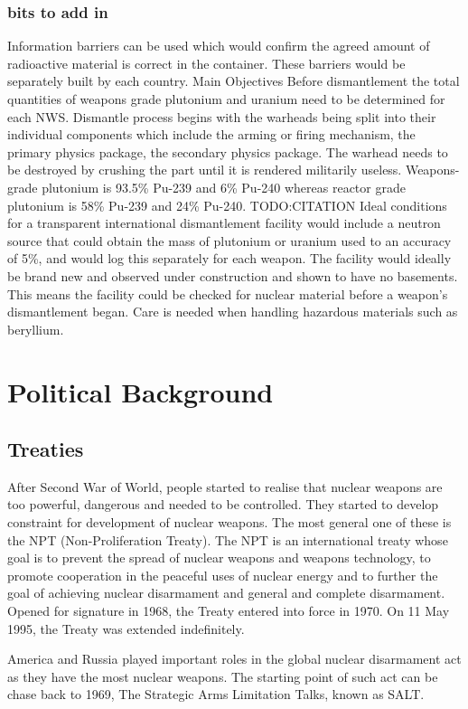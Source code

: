 \documentclass[twoside,titlepage,11pt,twocolumn,a4paper]{article}
\begin{document}
\subsubsection{bits to add in}
Information barriers can be used which would confirm the agreed amount
of radioactive material is correct in the container. These barriers
would be separately built by each country.  Main Objectives Before
dismantlement the total quantities of weapons grade plutonium and
uranium need to be determined for each NWS.  Dismantle process begins
with the warheads being split into their individual components which
include the arming or firing mechanism, the primary physics package,
the secondary physics package.  The warhead needs to be destroyed by
crushing the part until it is rendered militarily useless.
Weapons-grade plutonium is 93.5\% Pu-239 and 6\% Pu-240 whereas
reactor grade plutonium is 58\% Pu-239 and 24\% Pu-240. TODO:CITATION
Ideal conditions for a transparent international dismantlement
facility would include a neutron source that could obtain the mass of
plutonium or uranium used to an accuracy of 5\%, and would log this
separately for each weapon.  The facility would ideally be brand new
and observed under construction and shown to have no basements. This
means the facility could be checked for nuclear material before a
weapon’s dismantlement began.  Care is needed when handling hazardous
materials such as beryllium.

\section{Political Background}
\subsection{Treaties}
After Second War of World, people started to realise that nuclear
weapons are too powerful, dangerous and needed to be controlled. They
started to develop constraint for development of nuclear weapons.  The
most general one of these is the NPT (Non-Proliferation
Treaty). \citep{unoda} The NPT is an international treaty whose goal
is to prevent the spread of nuclear weapons and weapons technology, to
promote cooperation in the peaceful uses of nuclear energy and to
further the goal of achieving nuclear disarmament and general and
complete disarmament.  Opened for signature in 1968, the Treaty
entered into force in 1970.  On 11 May 1995, the Treaty was extended
indefinitely.

America and Russia played important roles in the global nuclear
disarmament act as they have the most nuclear weapons. The starting
point of such act can be chase back to 1969, The Strategic Arms
Limitation Talks, known as SALT.
\end{document}
